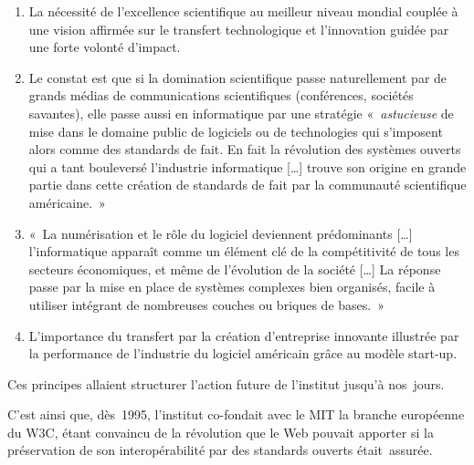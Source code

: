 \documentclass{FramateX}
\begin{document}
\begin{refsection}
\begin{enumerate}
\item La nécessité de l'excellence scientifique au meilleur niveau
mondial couplée à une vision affirmée sur le transfert technologique et
l'innovation guidée par une forte volonté d'impact.
\item Le constat est que si la domination scientifique passe
naturellement par de grands médias de communications scientifiques
(conférences, sociétés savantes), elle passe aussi en informatique par
une stratégie «~\textit{astucieuse} de mise
dans le domaine public de logiciels ou de technologies qui s'imposent
alors comme des standards de fait. En fait la révolution des systèmes
ouverts qui a tant bouleversé l'industrie informatique […] trouve son
origine en grande partie dans cette création de standards de fait par
la communauté scientifique américaine.~»
\item «~La numérisation et le rôle du logiciel deviennent prédominants
[…] l'informatique apparaît comme un élément clé de la compétitivité de
tous les secteurs économiques, et même de l'évolution de la société […]
La réponse passe par la mise en place de systèmes complexes bien
organisés, facile à utiliser intégrant de nombreuses couches ou briques
de bases.~» 
\item L'importance du transfert par la création d'entreprise innovante
illustrée par la performance de l'industrie du logiciel américain grâce
au modèle start-up.
\end{enumerate}


Ces principes allaient structurer l'action future de l'institut jusqu'à
nos~jours. 



C'est ainsi que, dès~1995, l'institut co-fondait avec le MIT la branche
européenne du W3C, étant convaincu de la révolution que le Web pouvait
apporter si la préservation de son interopérabilité par des standards
ouverts était~assurée. 



\end{refsection}
\end{document}
